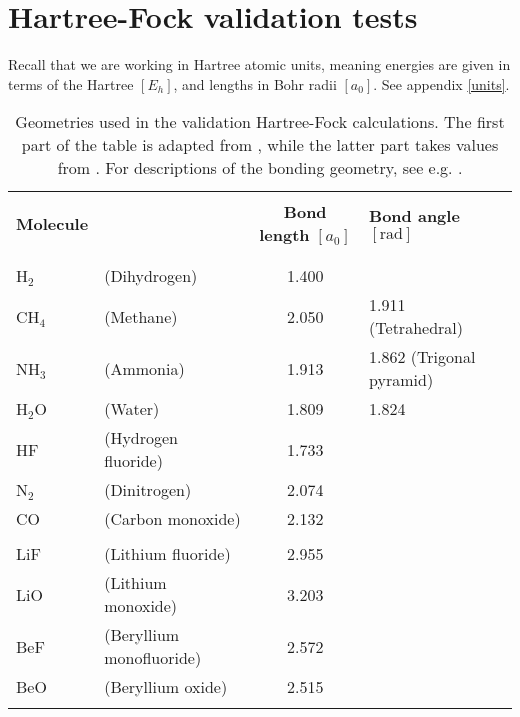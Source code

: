 \documentclass[../../master.tex]{subfiles}
\begin{document}
\renewcommand{\R}{{\bf R}}
\renewcommand{\r}{{\bf r}}
\newcommand{\p}{{\bf p}}
\newcommand{\q}{{\bf q}}
\renewcommand{\H}{\mathcal{H}}
\newcommand{\psit}{\left|\psi(t)\right\rangle}


\chapter{Hartree-Fock validation tests \label{hfvalid}}
Recall that we are working in Hartree atomic units, meaning energies are given in terms of the Hartree $[E_h]$, and lengths in Bohr radii $[a_0]$. See appendix \ref{units}.

\begin{table}
\setlength\extrarowheight{2pt}
\begin{tabularx}{\textwidth}{l X c l}
\hline
\hline
\\[-0.9em]
\textbf{Molecule} & & \textbf{Bond length} $[a_0]$ & \textbf{Bond angle} $[\text{rad}]$ \\
\\[-0.9em]
\hline
\\[-0.9em]
H${}_2$ & (Dihydrogen)   & 1.400 & \\
CH${}_4$ &(Methane)      & 2.050 & 1.911 (Tetrahedral)       \\
NH${}_3$ &(Ammonia)      & 1.913 & 1.862 (Trigonal pyramid)  \\
H${}_2$O &(Water)        & 1.809 & 1.824                     \\
HF &(Hydrogen fluoride)  & 1.733 & \\
N${}_2$ &(Dinitrogen)    & 2.074 & \\
CO &(Carbon monoxide)    & 2.132 & \\
\\[-0.0em]
LiF & (Lithium fluoride) & 2.955 & \\ %
LiO & (Lithium monoxide) & 3.203 & \\ %
BeF & (Beryllium monofluoride) & 2.572 & \\ %
BeO & (Beryllium oxide) & 2.515 & \\ %
\\[-0.9em]
\hline
\end{tabularx}
\caption{Geometries used in the validation Hartree-Fock calculations. The first part of the table is adapted from \cite{szabo}, while the latter part takes values from \cite{langhoff}. For descriptions of the bonding geometry, see e.g. \cite{zumdahl}. \label{tab:hfv1}}
\end{table}
\end{document}
